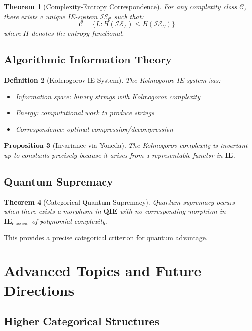 \documentclass[12pt]{article}
\newtheorem{theorem}{Theorem}[section]
\newtheorem{proposition}[theorem]{Proposition}
\newtheorem{definition}[theorem]{Definition}
\begin{document}
\begin{theorem}[Complexity-Entropy Correspondence]
For any complexity class $\mathcal{C}$, there exists a unique IE-system $\mathcal{IE}_{\mathcal{C}}$ such that:
\[\mathcal{C} = \{L : H(\mathcal{IE}_L) \leq H(\mathcal{IE}_{\mathcal{C}})\}\]
where $H$ denotes the entropy functional.
\end{theorem}

\subsection{Algorithmic Information Theory}

\begin{definition}[Kolmogorov IE-System]
The Kolmogorov IE-system has:
\begin{itemize}
\item Information space: binary strings with Kolmogorov complexity
\item Energy: computational work to produce strings
\item Correspondence: optimal compression/decompression
\end{itemize}
\end{definition}

\begin{proposition}[Invariance via Yoneda]
The Kolmogorov complexity is invariant up to constants precisely because it arises from a representable functor in $\mathbf{IE}$.
\end{proposition}

\subsection{Quantum Supremacy}

\begin{theorem}[Categorical Quantum Supremacy]
Quantum supremacy occurs when there exists a morphism in $\mathbf{QIE}$ with no corresponding morphism in $\mathbf{IE}_{\text{classical}}$ of polynomial complexity.
\end{theorem}

This provides a precise categorical criterion for quantum advantage.

\section{Advanced Topics and Future Directions}

\subsection{Higher Categorical Structures}
\end{document}
